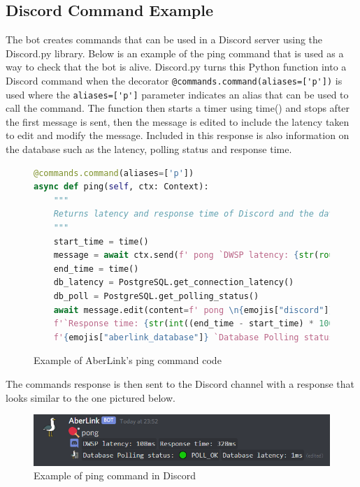 \subsection{Discord Command Example}

The bot creates commands that can be used in a Discord server using the Discord.py \cite{discord.py} library. Below is an example of the ping command that is used as a way to check that the bot is alive. Discord.py turns this Python function into a Discord command when the decorator \verb|@commands.command(aliases=['p'])| is used where the \verb|aliases=['p']| parameter indicates an alias that can be used to call the command. The function then starts a timer using time() and stops after the first message is sent, then the message is edited to include the latency taken to edit and modify the message. Included in this response is also information on the database such as the latency, polling status and response time.

\begin{figure}[H]
\begin{lstlisting}[language=Python]
@commands.command(aliases=['p'])
async def ping(self, ctx: Context):
	"""
	Returns latency and response time of Discord and the database
	"""
	start_time = time()
	message = await ctx.send(f' pong `DWSP latency: {str(round(ctx.bot.latency * 1000))}ms`')
	end_time = time()
	db_latency = PostgreSQL.get_connection_latency()
	db_poll = PostgreSQL.get_polling_status()
	await message.edit(content=f' pong \n{emojis["discord"]} `DWSP latency: {str(round(ctx.bot.latency * 1000))}ms` ' +
    f'`Response time: {str(int((end_time - start_time) * 1000))}ms` \n' +
    f'{emojis["aberlink_database"]} `Database Polling status: {db_poll}` `Database latency: {db_latency}ms`')

\end{lstlisting}
\caption{Example of AberLink's ping command code}
\label{fig:discord-command-ping-code}
\end{figure}

The commands response is then sent to the Discord channel with a response that looks similar to the one pictured below.

\begin{figure}[H]
	\centering
	\includegraphics[width=1\linewidth]{Figures/discord-ping-command.png}
	\caption{Example of ping command in Discord}
	\label{fig:discord-command-ping}
\end{figure}

